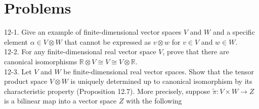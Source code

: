 \documentclass[10pt, letterpaper]{article}
\begin{document}
\section*{Problems}
12-1. Give an example of finite-dimensional vector spaces $V$ and $W$ and a specific element $\alpha \in V \otimes W$ that cannot be expressed as $v \otimes w$ for $v \in V$ and $w \in W$.\\
12-2. For any finite-dimensional real vector space $V$, prove that there are canonical isomorphisms $\mathbb{R} \otimes V \cong V \cong V \otimes \mathbb{R}$.\\
12-3. Let $V$ and $W$ be finite-dimensional real vector spaces. Show that the tensor product space $V \otimes W$ is uniquely determined up to canonical isomorphism by its characteristic property (Proposition 12.7). More precisely, suppose $\tilde{\pi}: V \times W \rightarrow Z$ is a bilinear map into a vector space $Z$ with the following
\end{document}
